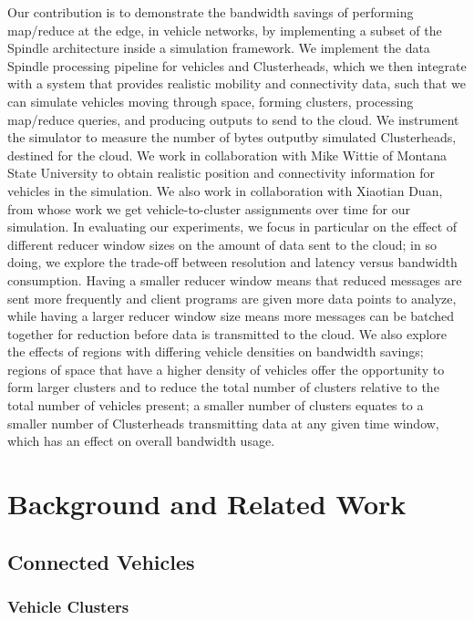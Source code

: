 \documentclass{thesis}
\begin{document}
    Our contribution is to demonstrate the bandwidth savings of performing map/reduce at the edge, in
    vehicle networks, by implementing a subset of the Spindle architecture inside a simulation framework.
    We implement the data Spindle processing pipeline for vehicles and Clusterheads, which we then integrate
    with a system that provides realistic mobility and connectivity data, such that we can simulate vehicles
    moving through space, forming clusters, processing map/reduce queries, and producing outputs to send to
    the cloud. We instrument the simulator to measure the number of bytes outputby simulated Clusterheads,
    destined for the cloud. We work in collaboration with Mike Wittie of Montana State University to obtain
    realistic position and connectivity information for vehicles in the simulation. We also work in
    collaboration with Xiaotian Duan, from whose work we get vehicle-to-cluster assignments over time
    for our simulation. In evaluating our experiments, we focus in particular on the effect of different
    reducer window sizes on the amount of data sent to the cloud; in so doing, we explore the trade-off
    between resolution and latency versus bandwidth consumption. Having a smaller reducer window means
    that reduced messages are sent more frequently and client programs are given more data points to
    analyze, while having a larger reducer window size means more messages can be batched together for
    reduction before data is transmitted to the cloud. We also explore the effects of regions with
    differing vehicle densities on bandwidth savings; regions of space that have a higher density
    of vehicles offer the opportunity to form larger clusters and to reduce the total number
    of clusters relative to the total number of vehicles present; a smaller number of clusters
    equates to a smaller number of Clusterheads transmitting data at any given time window, which
    has an effect on overall bandwidth usage.

\chapter{Background and Related Work}
    \section{Connected Vehicles}
    \subsection{Vehicle Clusters}
\end{document}
